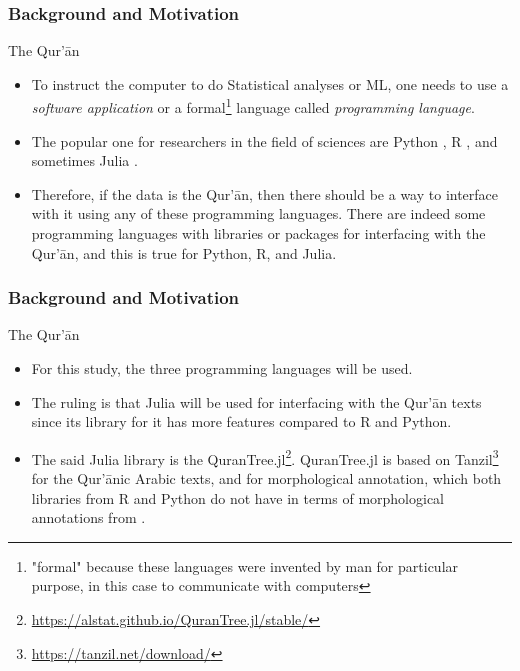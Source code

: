 \documentclass{beamer}
\theoremstyle{definition}
\begin{document}
\begin{frame}[t, fragile]\justifying
\frametitle{Background and Motivation}
\begin{block}{The Qur'\=an}
\begin{itemize}\justifying        
\item To instruct the computer to do Statistical analyses or ML, one needs to use a \textit{software application} or a formal\footnote{"formal" because these languages were invented by man for particular purpose, in this case to communicate with computers} language called \textit{programming language}.\pause
\item The popular one for researchers in the field of sciences are Python \cite{van1995python}, R \cite{rprogramming}, and sometimes Julia \cite{Julia2017}. \pause
\item Therefore, if the data is the Qur'\=an, then there should be a way to interface with it using any of these programming languages. There are indeed some programming languages with libraries or packages for interfacing with the Qur'\=an, and this is true for Python, R, and \mbox{Julia}. 
\end{itemize}
\end{block}
\end{frame}

\begin{frame}[t, fragile]\justifying
\frametitle{Background and Motivation}
\begin{block}{The Qur'\=an}
\begin{itemize}\justifying    
\item For this study, the three programming languages will be used. \pause
\item The ruling is that Julia will be used for interfacing with the Qur'\=an texts since its library for it has more features \cite{asaad2021qurantree} compared to R and Python. \pause
\item The said Julia library is the QuranTree.jl\footnote{\url{https://alstat.github.io/QuranTree.jl/stable/}}. QuranTree.jl is based on Tanzil\footnote{\url{https://tanzil.net/download/}} for the Qur'\=anic Arabic texts, and \cite{dukes-habash-2010-morphological} for morphological annotation, which both libraries from R and Python do not have in terms of morphological annotations from \cite{dukes-habash-2010-morphological}. 
\end{itemize}
\end{block}
\end{frame}
\end{document}
